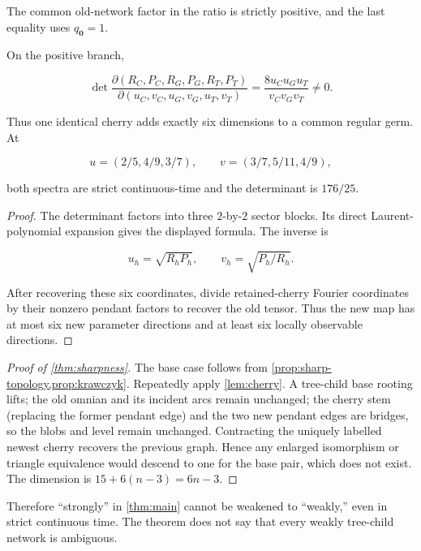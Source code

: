 The common old-network factor in the ratio is strictly positive, and the
last equality uses \(q_{\mathbf0}=1\).

\begin{lemma}\label{lem:cherry}
On the positive branch,

\[
 \det\frac{\partial(R_C,P_C,R_G,P_G,R_T,P_T)}
 {\partial(u_C,v_C,u_G,v_G,u_T,v_T)}
 =\frac{8u_Cu_Gu_T}{v_Cv_Gv_T}\ne0.
\]

Thus one identical cherry adds exactly six dimensions to a common regular
germ.  At

\[
 u=(2/5,4/9,3/7),\qquad v=(3/7,5/11,4/9),
\]

both spectra are strict continuous-time and the determinant is \(176/25\).
\end{lemma}

\begin{proof}
The determinant factors into three \(2\)-by-\(2\) sector blocks.  Its direct
Laurent-polynomial expansion gives the displayed formula.  The inverse is

\[
 u_h=\sqrt{R_hP_h},\qquad v_h=\sqrt{P_h/R_h}.
\]

After recovering these six coordinates, divide retained-cherry Fourier
coordinates by their nonzero pendant factors to recover the old tensor.
Thus the new map has at most six new parameter directions and at least six
locally observable directions.
\end{proof}

\begin{proof}[Proof of \cref{thm:sharpness}]
The base case follows from
\cref{prop:sharp-topology,prop:krawczyk}.  Repeatedly apply
\cref{lem:cherry}.  A tree-child base rooting lifts; the old omnian and its
incident arcs remain unchanged; the cherry stem (replacing the former
pendant edge) and the two new pendant edges are bridges, so the blobs and
level remain unchanged.  Contracting the uniquely labelled newest cherry
recovers the previous graph.  Hence any enlarged isomorphism or triangle
equivalence would descend to one for the base pair, which does not exist.
The dimension is \(15+6(n-3)=6n-3\).
\end{proof}

Therefore ``strongly'' in \cref{thm:main} cannot be weakened to ``weakly,''
even in strict continuous time.  The theorem does not say that every weakly
tree-child network is ambiguous.

